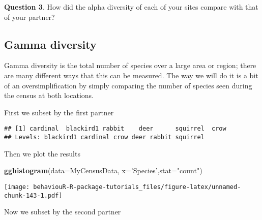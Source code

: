 \documentclass[]{book}
\newenvironment{Shaded}{\begin{snugshade}}{\end{snugshade}}
\newcommand{\DataTypeTok}[1]{\textcolor[rgb]{0.13,0.29,0.53}{#1}}
\newcommand{\KeywordTok}[1]{\textcolor[rgb]{0.13,0.29,0.53}{\textbf{#1}}}
\newcommand{\NormalTok}[1]{#1}
\newcommand{\OperatorTok}[1]{\textcolor[rgb]{0.81,0.36,0.00}{\textbf{#1}}}
\newcommand{\StringTok}[1]{\textcolor[rgb]{0.31,0.60,0.02}{#1}}
\begin{document}
\textbf{Question 3}. How did the alpha diversity of each of your sites compare with that of your partner?

\hypertarget{gamma-diversity}{%
\subsection*{Gamma diversity}\label{gamma-diversity}}

Gamma diversity is the total number of species over a large area or region; there are many different ways that this can be measured. The way we will do it is a bit of an oversimplification by simply comparing the number of species seen during the census at both locations.

First we subset by the first partner

\begin{Shaded}
\end{Shaded}

\begin{verbatim}
## [1] cardinal  blackird1 rabbit    deer      squirrel  crow     
## Levels: blackird1 cardinal crow deer rabbit squirrel
\end{verbatim}

Then we plot the results

\begin{Shaded}
\begin{Highlighting}[]
\KeywordTok{gghistogram}\NormalTok{(}\DataTypeTok{data=}\NormalTok{MyCensusData, }\DataTypeTok{x=}\StringTok{'Species'}\NormalTok{,}\DataTypeTok{stat=}\StringTok{"count"}\NormalTok{)}
\end{Highlighting}
\end{Shaded}

\texttt{[image: behaviouR-R-package-tutorials\_files/figure-latex/unnamed-chunk-143-1.pdf]}

Now we subset by the second partner

\begin{Shaded}
\end{Shaded}
\end{document}
